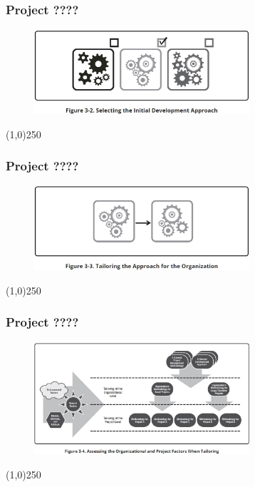\begin{frame}
\frametitle{Project ????}
 \begin{figure}
    \centering
        \includegraphics[width = 8cm]{../images/guide/Fig3-2.jpg}
    \label{guidefig:3-2}
 \end{figure}
\end{frame}
\begin{center}\line(1,0){250}\end{center}

\begin{frame}
\frametitle{Project ????}
 \begin{figure}
    \centering
        \includegraphics[width = 8cm]{../images/guide/Fig3-3.jpg}
    \label{guidefig:3-3}
 \end{figure}
\end{frame}
\begin{center}\line(1,0){250}\end{center}

\begin{frame}
\frametitle{Project ????}
 \begin{figure}
    \centering
        \includegraphics[width = 8cm]{../images/guide/Fig3-4.jpg}
    \label{guidefig:3-4}
 \end{figure}
\end{frame}
\begin{center}\line(1,0){250}\end{center}

